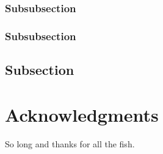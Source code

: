 \documentclass[fleqn,10pt,lineno]{wlpeerj} %
\begin{document}
\lipsum[11] %

\subsubsection*{Subsubsection}

\lipsum[12] %

\subsubsection*{Subsubsection}

\lipsum[14] %

\subsection*{Subsection}

\lipsum[15-20] %

\section*{Acknowledgments}

So long and thanks for all the fish.


\fi
\end{document}
